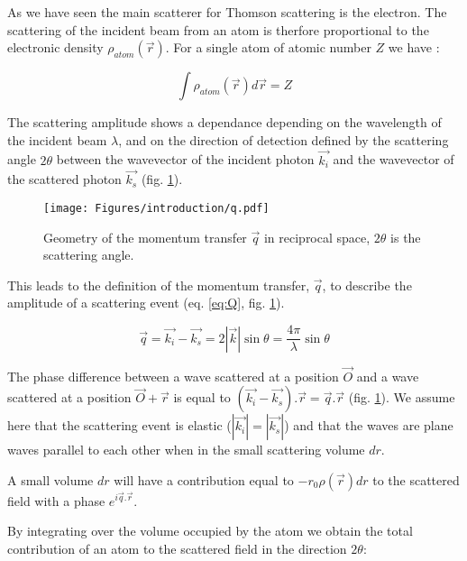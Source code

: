 As we have seen the main scatterer for Thomson scattering is the electron.
The scattering of the incident beam from an atom is therfore proportional to the electronic density $\rho_{atom}(\vec{r})$.
For a single atom of atomic number $Z$ we have :

\begin{equation}
    \int \rho_{atom} (\vec{r}) d\vec{r} = Z
\end{equation}

The scattering amplitude shows a dependance depending on the wavelength of the incident beam $\lambda$, and on the direction of detection defined by the scattering angle $2\theta$ between the wavevector of the incident photon $\vec{k_i}$ and the wavevector of the scattered photon $\vec{k_s}$ (fig. \ref{fig:q}).

\begin{figure}[!htb]
    \centering
    \texttt{[image: Figures/introduction/q.pdf]}
    \caption{Geometry of the momentum transfer $\vec{q}$ in reciprocal space, $2\theta$ is the scattering angle.}
    \label{fig:q}
\end{figure}

This leads to the definition of the momentum transfer, $\vec{q}$, to describe the amplitude of a scattering event (eq. \ref{eq:Q}, fig. \ref{fig:q}).

\begin{equation}
    \label{eq:Q}
    \vec{q}=\vec{k_i}-\vec{k_s}=2|\vec{k}|\sin{\theta}=\frac{4\pi}{\lambda} \sin{\theta}
\end{equation}{}

The phase difference between a wave scattered at a position $\vec{O}$ and a wave scattered at a position $\vec{O}+\vec{r}$ is equal to $(\vec{k_i} - \vec{k_s}).\vec{r} = \vec{q}.\vec{r}$ (fig. \ref{fig:q}).
We assume here that the scattering event is elastic ($|\vec{k_i}|=|\vec{k_s}|$) and that the waves are plane waves parallel to each other when in the small scattering volume $dr$.

A small volume $dr$ will have a contribution equal to $-r_0 \rho(\vec{r})dr$ to the scattered field with a phase $e^{i\vec{q}.\vec{r}}$.

By integrating over the volume occupied by the atom we obtain the total contribution of an atom to the scattered field in the direction $2\theta$:

